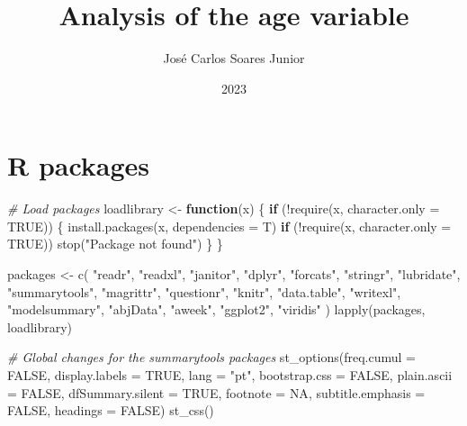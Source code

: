 \documentclass[
]{article}
\title{Analysis of the age variable}
\author{José Carlos Soares Junior}
\date{2023}
\newenvironment{Shaded}{\begin{snugshade}}{\end{snugshade}}
\newcommand{\AttributeTok}[1]{\textcolor[rgb]{0.77,0.63,0.00}{#1}}
\newcommand{\CommentTok}[1]{\textcolor[rgb]{0.56,0.35,0.01}{\textit{#1}}}
\newcommand{\ConstantTok}[1]{\textcolor[rgb]{0.00,0.00,0.00}{#1}}
\newcommand{\ControlFlowTok}[1]{\textcolor[rgb]{0.13,0.29,0.53}{\textbf{#1}}}
\newcommand{\FunctionTok}[1]{\textcolor[rgb]{0.00,0.00,0.00}{#1}}
\newcommand{\NormalTok}[1]{#1}
\newcommand{\OtherTok}[1]{\textcolor[rgb]{0.56,0.35,0.01}{#1}}
\newcommand{\SpecialCharTok}[1]{\textcolor[rgb]{0.00,0.00,0.00}{#1}}
\newcommand{\StringTok}[1]{\textcolor[rgb]{0.31,0.60,0.02}{#1}}
\renewenvironment{Shaded}{\begin{mdframed}[ backgroundcolor=shadecolor, linecolor = shadecolor, leftmargin=\dimexpr\leftmargin-2pt\relax, innerleftmargin=1.6pt, innertopmargin=5pt, skipabove=10pt,skipbelow=3pt ]}{\end{mdframed}}
\begin{document}
\maketitle

{
\setcounter{tocdepth}{3}
\tableofcontents
}
\newpage

\hypertarget{r-packages}{%
\section{R packages}\label{r-packages}}

\begin{Shaded}
\begin{Highlighting}[]
\CommentTok{\# Load packages}
\NormalTok{loadlibrary }\OtherTok{\textless{}{-}} \ControlFlowTok{function}\NormalTok{(x) \{}
  \ControlFlowTok{if}\NormalTok{ (}\SpecialCharTok{!}\FunctionTok{require}\NormalTok{(x, }\AttributeTok{character.only =} \ConstantTok{TRUE}\NormalTok{)) \{}
    \FunctionTok{install.packages}\NormalTok{(x, }\AttributeTok{dependencies =}\NormalTok{ T)}
  \ControlFlowTok{if}\NormalTok{ (}\SpecialCharTok{!}\FunctionTok{require}\NormalTok{(x, }\AttributeTok{character.only =} \ConstantTok{TRUE}\NormalTok{))}
  \FunctionTok{stop}\NormalTok{(}\StringTok{"Package not found"}\NormalTok{)}
\NormalTok{  \}}
\NormalTok{\}}

\NormalTok{packages }\OtherTok{\textless{}{-}} \FunctionTok{c}\NormalTok{(}
  \StringTok{"readr"}\NormalTok{,}
  \StringTok{"readxl"}\NormalTok{,}
  \StringTok{"janitor"}\NormalTok{,}
  \StringTok{"dplyr"}\NormalTok{,}
  \StringTok{"forcats"}\NormalTok{,}
  \StringTok{"stringr"}\NormalTok{,}
  \StringTok{"lubridate"}\NormalTok{,}
  \StringTok{"summarytools"}\NormalTok{,}
  \StringTok{"magrittr"}\NormalTok{,}
  \StringTok{"questionr"}\NormalTok{,}
  \StringTok{"knitr"}\NormalTok{,}
  \StringTok{"data.table"}\NormalTok{,}
  \StringTok{"writexl"}\NormalTok{,}
  \StringTok{"modelsummary"}\NormalTok{,}
  \StringTok{"abjData"}\NormalTok{,}
  \StringTok{"aweek"}\NormalTok{,}
  \StringTok{"ggplot2"}\NormalTok{,}
  \StringTok{"viridis"}
\NormalTok{)}
\FunctionTok{lapply}\NormalTok{(packages, loadlibrary)}

\CommentTok{\# Global changes for the summarytools packages}
\FunctionTok{st\_options}\NormalTok{(}\AttributeTok{freq.cumul =} \ConstantTok{FALSE}\NormalTok{,          }
           \AttributeTok{display.labels =} \ConstantTok{TRUE}\NormalTok{,}
           \AttributeTok{lang =} \StringTok{"pt"}\NormalTok{,}
           \AttributeTok{bootstrap.css =} \ConstantTok{FALSE}\NormalTok{,}
           \AttributeTok{plain.ascii =} \ConstantTok{FALSE}\NormalTok{,}
           \AttributeTok{dfSummary.silent =} \ConstantTok{TRUE}\NormalTok{,}
           \AttributeTok{footnote =} \ConstantTok{NA}\NormalTok{,}
           \AttributeTok{subtitle.emphasis =} \ConstantTok{FALSE}\NormalTok{,}
           \AttributeTok{headings =} \ConstantTok{FALSE}\NormalTok{)}
\FunctionTok{st\_css}\NormalTok{()}
\end{Highlighting}
\end{Shaded}
\end{document}

